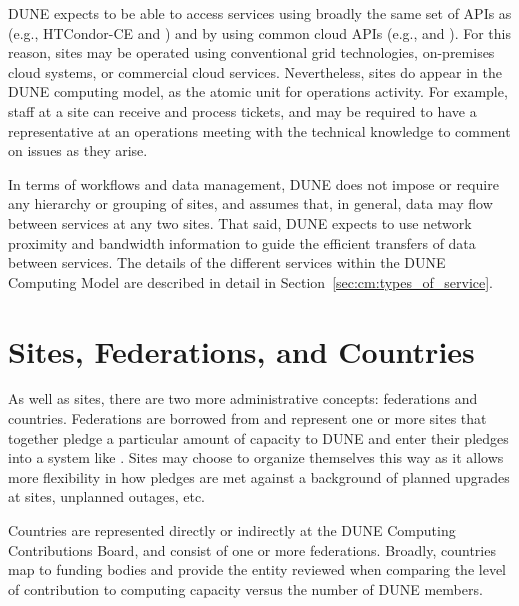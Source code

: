 \documentclass[../main-v1.tex]{subfiles}
\begin{document}
{DUNE expects to be able to access services using broadly the same set of APIs as  (e.g., HTCondor-CE and ) and by using common cloud APIs (e.g.,  and ). 
For this reason, sites may be operated using conventional grid technologies, on-premises cloud systems, or commercial cloud services. Nevertheless, sites do appear in the DUNE computing model, as the atomic unit for operations activity. %
For example, staff at a site can receive and process tickets, %
and may be required to have a representative at an operations meeting with the technical knowledge to comment on issues as they arise.

In terms of workflows and data management, DUNE does not impose or require any hierarchy or grouping of sites, and assumes that, in general, data may flow between services at any two sites. That said, DUNE expects to use network proximity and bandwidth information to guide the efficient transfers of data between services. The details of the different services within the DUNE Computing Model are described in detail in Section~\ref{sec:cm:types_of_service}.

\section{Sites, Federations, and Countries}
\label{sec:cm:federations}

As well as sites, there are two more administrative concepts: federations and countries.
Federations are borrowed from  and represent one or more sites that together pledge a particular amount of capacity to DUNE and enter their pledges into a system like . %
Sites may choose to organize themselves this way as it allows more flexibility in how pledges are met against a background of planned upgrades at sites, unplanned outages, etc. 

Countries are represented directly or indirectly at the DUNE Computing Contributions Board, and consist of one or more federations. Broadly, countries map to funding bodies and %
provide the entity reviewed when comparing the level of contribution to computing capacity versus the number of DUNE members. %




}
\end{document}
